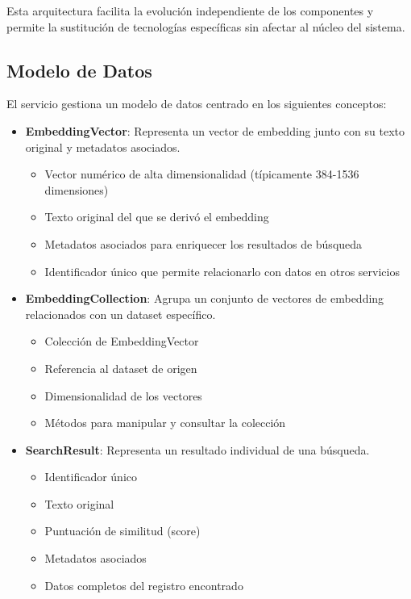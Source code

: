 \documentclass[12pt,a4paper]{article}
\begin{document}
Esta arquitectura facilita la evolución independiente de los componentes y permite la sustitución de tecnologías específicas sin afectar al núcleo del sistema.

\subsection{Modelo de Datos}
\label{subsec:ss-modelo-datos}

El servicio gestiona un modelo de datos centrado en los siguientes conceptos:

\begin{itemize}
    \item \textbf{EmbeddingVector}: Representa un vector de embedding junto con su texto original y metadatos asociados.
    \begin{itemize}
        \item Vector numérico de alta dimensionalidad (típicamente 384-1536 dimensiones)
        \item Texto original del que se derivó el embedding
        \item Metadatos asociados para enriquecer los resultados de búsqueda
        \item Identificador único que permite relacionarlo con datos en otros servicios
    \end{itemize}
    
    \item \textbf{EmbeddingCollection}: Agrupa un conjunto de vectores de embedding relacionados con un dataset específico.
    \begin{itemize}
        \item Colección de EmbeddingVector
        \item Referencia al dataset de origen
        \item Dimensionalidad de los vectores
        \item Métodos para manipular y consultar la colección
    \end{itemize}
    
    \item \textbf{SearchResult}: Representa un resultado individual de una búsqueda.
    \begin{itemize}
        \item Identificador único
        \item Texto original
        \item Puntuación de similitud (score)
        \item Metadatos asociados
        \item Datos completos del registro encontrado
    \end{itemize}
    

\end{itemize}
\end{document}

